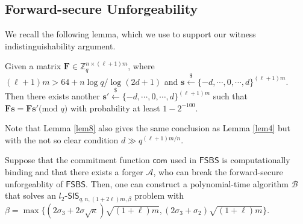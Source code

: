 \documentclass[runningheads]{llncs}
\def\cal{\mathcal}
\begin{document}
\subsection{Forward-secure Unforgeability} \label{fseu}
We recall the following lemma, which we use to support
our witness indistinguishability argument. 
\begin{lemma} \label{lem4}
Given a matrix $\mathbf{F} \in \mathbb{Z}_q^{n \times (\ell+1)m}$, where $(\ell+1)m>64+n\log q/\log(2d+1)$ and 
$\mathbf{s} \xleftarrow{\$} \{-d, \cdots, 0, \cdots, d\}^{(\ell+1)m}$. 
Then  there exists another $\mathbf{s}' \xleftarrow{\$} \{-d, \cdots, 0, \cdots, d\}^{(\ell+1)m}$ 
such that $\mathbf{F}\mathbf{s}=\mathbf{F}\mathbf{s}' \text{(mod } q)$
with probability at least $1-2^{-100}$.
\end{lemma}
%
Note that Lemma \ref{lem8} also gives the same conclusion as Lemma \ref{lem4} 
but with the not so clear condition $d \gg q^{(\ell+1)m/n}$.
%
\begin{theorem} \label{theo1} 
Suppose that the commitment function  $\mathsf{com}$ used in $\mathsf{FSBS}$ is 
computationally binding and that there exists a forger $\mathcal{A}$, 
who can break the forward-secure unforgeablity of $\mathsf{FSBS}$. 
Then, one can construct a polynomial-time algorithm $\mathcal{B}$ 
that solves an $l_2$-$\mathsf{SIS}_{q,n,(1+2\ell)m, \beta}$ 
problem with $\beta=\max\{(2\sigma_3+2\sigma\sqrt{\kappa})\sqrt{(1+\ell)m}, (2\sigma_3+\sigma_2)\sqrt{(1+\ell)m}\}$. 
	\iffalse
	The success probability $p$ of $\mathcal{B}$  is  at least \begin{align*}
		\min \frac{1}{\tau}\left\{ \frac{1}{2}(1-\gamma)\left(1-\frac{1}{|\cal{R}_H|}\right)\left(\frac{\delta-\frac{1}{|\cal{R}_H|}}{q_H}-\frac{1}{|\cal{R}_H|}\right), \delta\left(1-\frac{1}{|\cal{R}_H|}\right) \right\}.
	\end{align*} 
	\fi
\end{theorem}
\end{document}
